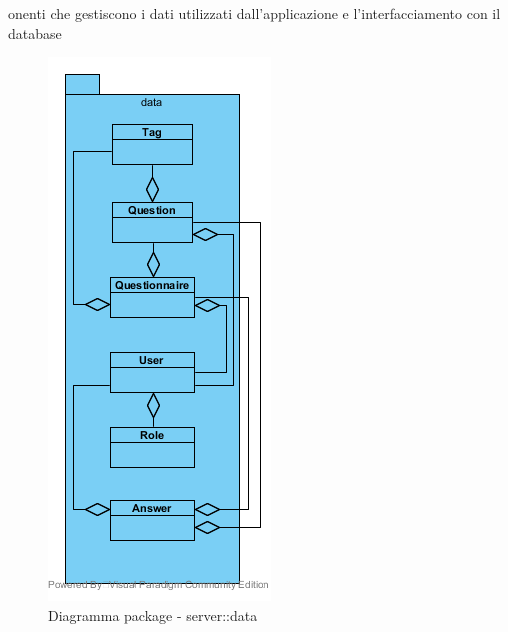 onenti che gestiscono i dati utilizzati dall'applicazione e l'interfacciamento con il database\begin{center}
	\begin{figure}[H]
		\centering \includegraphics[scale=4, max width=\textwidth, max height=\myheight]{../img/diagrammiClassi/server/data.png}
		\caption{Diagramma package - server::data}
	\end{figure}
\end{center}\hypertarget{server::data::Tag}{}
